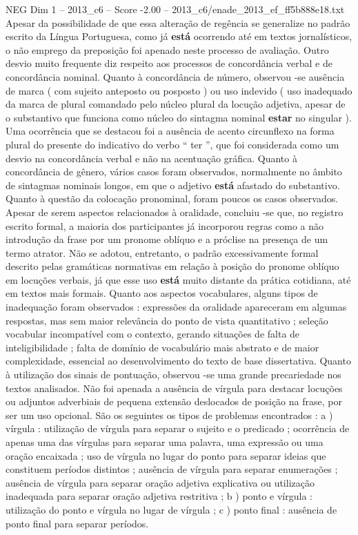 \begin{textsample}{NEG Dim 1 – 2013\_c6 – Score -2.00 – 2013\_c6/enade\_2013\_ef\_ff5b888e18.txt}
Apesar da possibilidade de que essa alteração de regência se generalize no padrão escrito da Língua Portuguesa, como já \textbf{está} ocorrendo até em textos jornalísticos, o não emprego da preposição foi apenado neste processo de avaliação.
Outro desvio muito frequente diz respeito aos processos de concordância verbal e de concordância nominal.
Quanto à concordância de número, observou -se ausência de marca ( com sujeito anteposto ou posposto ) ou uso indevido ( uso inadequado da marca de plural comandado pelo núcleo plural da locução adjetiva, apesar de o substantivo que funciona como núcleo do sintagma nominal \textbf{estar} no singular ).
Uma ocorrência que se destacou foi a ausência de acento circunflexo na forma plural do presente do indicativo do verbo “ ter ”, que foi considerada como um desvio na concordância verbal e não na acentuação gráfica.
Quanto à concordância de gênero, vários casos foram observados, normalmente no âmbito de sintagmas nominais longos, em que o adjetivo \textbf{está} afastado do substantivo.
Quanto à questão da colocação pronominal, foram poucos os casos observados.
Apesar de serem aspectos relacionados à oralidade, concluiu -se que, no registro escrito formal, a maioria dos participantes já incorporou regras como a não introdução da frase por um pronome oblíquo e a próclise na presença de um termo atrator.
Não se adotou, entretanto, o padrão excessivamente formal descrito pelas gramáticas normativas em relação à posição do pronome oblíquo em locuções verbais, já que esse uso \textbf{está} muito distante da prática cotidiana, até em textos mais formais.
Quanto aos aspectos vocabulares, alguns tipos de inadequação foram observados : expressões da oralidade apareceram em algumas respostas, mas sem maior relevância do ponto de vista quantitativo ; seleção vocabular incompatível com o contexto, gerando situações de falta de inteligibilidade ; falta de domínio de vocabulário mais abstrato e de maior complexidade, essencial ao desenvolvimento do texto de base dissertativa.
Quanto à utilização dos sinais de pontuação, observou -se uma grande precariedade nos textos analisados.
Não foi apenada a ausência de vírgula para destacar locuções ou adjuntos adverbiais de pequena extensão deslocados de posição na frase, por ser um uso opcional.
São os seguintes os tipos de problemas encontrados : a ) vírgula : utilização de vírgula para separar o sujeito e o predicado ; ocorrência de apenas uma das vírgulas para separar uma palavra, uma expressão ou uma oração encaixada ; uso de vírgula no lugar do ponto para separar ideias que constituem períodos distintos ; ausência de vírgula para separar enumerações ; ausência de vírgula para separar oração adjetiva explicativa ou utilização inadequada para separar oração adjetiva restritiva ; b ) ponto e vírgula : utilização do ponto e vírgula no lugar de vírgula ; c ) ponto final : ausência de ponto final para separar períodos.

\end{textsample}
